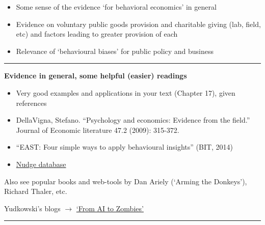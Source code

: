 \documentclass[]{article}
\providecommand{\tightlist}{%
  \setlength{\itemsep}{0pt}\setlength{\parskip}{0pt}}
\begin{document}
\bigskip

\begin{itemize}
\tightlist
\item
  Some sense of the evidence `for behavioral economics' in general
\end{itemize}

\bigskip

\begin{itemize}
\tightlist
\item
  Evidence on voluntary public goods provision and charitable giving
  (lab, field, etc) and factors leading to greater provision of each
\end{itemize}

\bigskip

\begin{itemize}
\tightlist
\item
  Relevance of `behavioural biases' for public policy and business
\end{itemize}

\begin{center}\rule{0.5\linewidth}{\linethickness}\end{center}

\textbf{Evidence in general, some helpful (easier) readings}

\begin{itemize}
\item
  Very good examples and applications in your text (Chapter 17), given
  references
\item
  DellaVigna, Stefano. ``Psychology and economics: Evidence from the
  field.'' Journal of Economic literature 47.2 (2009): 315-372.
\item
  ``EAST: Four simple ways to apply behavioural insights'' (BIT, 2014)
\item
  \href{https://www.stir.ac.uk/media/schools/management/documents/economics/Nudge\%20Database\%201.2.pdf}{Nudge
  database}
\end{itemize}

\bigskip

Also see popular books and web-tools by Dan Ariely (`Arming the
Donkeys'), Richard Thaler, etc.

Yudkowski's blogs \(\rightarrow\)
\href{https://wiki.lesswrong.com/wiki/Rationality:_From_AI_to_Zombies'}{`From
AI to Zombies'}

\begin{center}\rule{0.5\linewidth}{\linethickness}\end{center}
\end{document}
